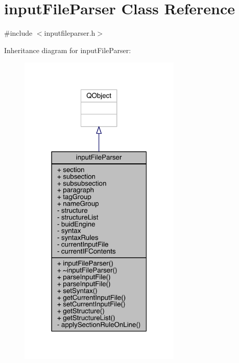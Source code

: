 \hypertarget{classinput_file_parser}{\section{input\+File\+Parser Class Reference}
\label{classinput_file_parser}
}


{\ttfamily \#include $<$inputfileparser.\+h$>$}



Inheritance diagram for input\+File\+Parser\+:\nopagebreak
\begin{figure}[H]
\begin{center}
\leavevmode
\includegraphics[width=219pt]{classinput_file_parser__inherit__graph}
\end{center}
\end{figure}


